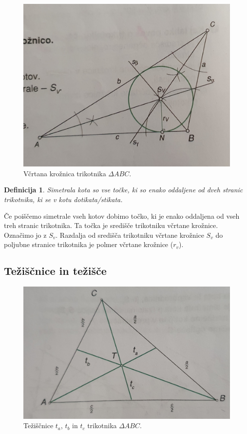 \documentclass{article}
\newtheorem{definicija}{Definicija}[subsection]
\begin{document}
\begin{figure}[h]
    \includegraphics[width=\linewidth]{vcrtanaKroznica.png}
    \centering
    \caption{Včrtana krožnica trikotnika $\Delta ABC$.}
\end{figure}

\begin{definicija}
    Simetrala kota so vse točke, ki so enako oddaljene od dveh stranic trikotnika, ki se v kotu dotikata/stikata. 
\end{definicija}

Če poiščemo simetrale vseh kotov dobimo točko, ki je enako oddaljena od vseh treh stranic trikotnika. Ta točka je središče trikotniku včrtane krožnice. Označimo jo z $S_v$. Razdalja od središča trikotniku včrtane krožnice $S_v$ do poljubne stranice trikotnika je polmer včrtane krožnice ($r_v$).


\pagebreak
\subsection{ Težiščnice in težišče }

\begin{figure}[h]
    \includegraphics[width=\linewidth]{teziscniceTrikotnika.png}
    \centering
    \caption{ Težiščnice $t_a$, $t_b$ in $t_c$ trikotnika $\Delta ABC$.}
\end{figure}
\end{document}
